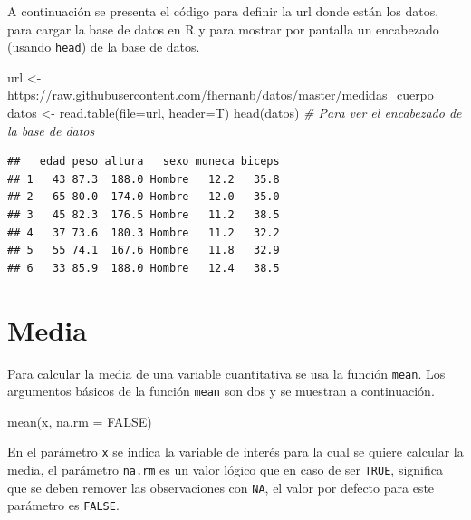 \documentclass[
]{book}
\makeatletter
\newenvironment{Shaded}{\begin{snugshade}}{\end{snugshade}}
\newcommand{\AttributeTok}[1]{\textcolor[rgb]{0.77,0.63,0.00}{#1}}
\newcommand{\CommentTok}[1]{\textcolor[rgb]{0.56,0.35,0.01}{\textit{#1}}}
\newcommand{\ConstantTok}[1]{\textcolor[rgb]{0.00,0.00,0.00}{#1}}
\newcommand{\FunctionTok}[1]{\textcolor[rgb]{0.00,0.00,0.00}{#1}}
\newcommand{\NormalTok}[1]{#1}
\newcommand{\OtherTok}[1]{\textcolor[rgb]{0.56,0.35,0.01}{#1}}
\newcommand{\StringTok}[1]{\textcolor[rgb]{0.31,0.60,0.02}{#1}}
\newenvironment{kframe}{%
\medskip{}
\setlength{\fboxsep}{.8em}
 \def\at@end@of@kframe{}%
 \ifinner\ifhmode%
  \def\at@end@of@kframe{\end{minipage}}%
  \begin{minipage}{\columnwidth}%
 \fi\fi%
 \def\FrameCommand##1{\hskip\@totalleftmargin \hskip-\fboxsep
 \colorbox{shadecolor}{##1}\hskip-\fboxsep
     \hskip-\linewidth \hskip-\@totalleftmargin \hskip\columnwidth}%
 \MakeFramed {\advance\hsize-\width
   \@totalleftmargin\z@ \linewidth\hsize
   \@setminipage}}%
 {\par\unskip\endMakeFramed%
 \at@end@of@kframe}
\renewenvironment{Shaded}{\begin{kframe}}{\end{kframe}}
\makeatother
\begin{document}
A continuación se presenta el código para definir la url donde están los datos, para cargar la base de datos en R y para mostrar por pantalla un encabezado (usando \texttt{head}) de la base de datos.

\begin{Shaded}
\begin{Highlighting}[]
\NormalTok{url }\OtherTok{\textless{}{-}} \StringTok{\textquotesingle{}https://raw.githubusercontent.com/fhernanb/datos/master/medidas\_cuerpo\textquotesingle{}}
\NormalTok{datos }\OtherTok{\textless{}{-}} \FunctionTok{read.table}\NormalTok{(}\AttributeTok{file=}\NormalTok{url, }\AttributeTok{header=}\NormalTok{T)}
\FunctionTok{head}\NormalTok{(datos)  }\CommentTok{\# Para ver el encabezado de la base de datos}
\end{Highlighting}
\end{Shaded}

\begin{verbatim}
##   edad peso altura   sexo muneca biceps
## 1   43 87.3  188.0 Hombre   12.2   35.8
## 2   65 80.0  174.0 Hombre   12.0   35.0
## 3   45 82.3  176.5 Hombre   11.2   38.5
## 4   37 73.6  180.3 Hombre   11.2   32.2
## 5   55 74.1  167.6 Hombre   11.8   32.9
## 6   33 85.9  188.0 Hombre   12.4   38.5
\end{verbatim}

\hypertarget{media}{%
\section{\texorpdfstring{Media  }{Media  }}\label{media}}

Para calcular la media de una variable cuantitativa se usa la función \texttt{mean}. Los argumentos básicos de la función \texttt{mean} son dos y se muestran a continuación.

\begin{Shaded}
\begin{Highlighting}[]
\FunctionTok{mean}\NormalTok{(x, }\AttributeTok{na.rm =} \ConstantTok{FALSE}\NormalTok{)}
\end{Highlighting}
\end{Shaded}

En el parámetro \texttt{x} se indica la variable de interés para la cual se quiere calcular la media, el parámetro \texttt{na.rm} es un valor lógico que en caso de ser \texttt{TRUE}, significa que se deben remover las observaciones con \texttt{NA}, el valor por defecto para este parámetro es \texttt{FALSE}.
\end{document}
